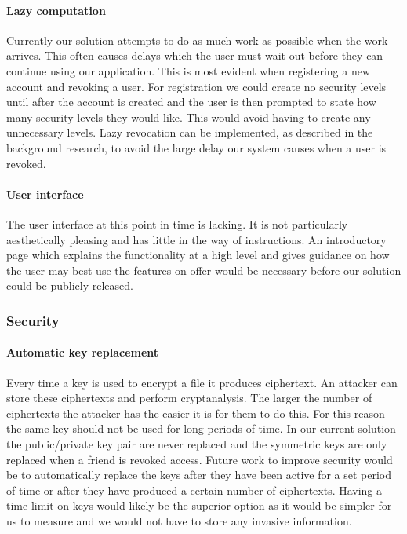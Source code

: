 \documentclass[12pt, titlepage]{article}
\begin{document}
\paragraph*{Lazy computation} Currently our solution attempts to do as much work as possible when the work arrives. This often causes delays which the user must wait out before they can continue using our application. This is most evident when registering a new account and revoking a user. For registration we could create no security levels until after the account is created and the user is then prompted to state how many security levels they would like. This would avoid having to create any unnecessary levels.
\newline \indent Lazy revocation can be implemented, as described in the background research, to avoid the large delay our system causes when a user is revoked.
\paragraph*{User interface} The user interface at this point in time is lacking. It is not particularly aesthetically pleasing and has little in the way of instructions. An introductory page which explains the functionality at a high level and gives guidance on how the user may best use the features on offer would be necessary before our solution could be publicly released.

\subsubsection*{Security}
\paragraph*{Automatic key replacement} Every time a key is used to encrypt a file it produces ciphertext. An attacker can store these ciphertexts and perform cryptanalysis. The larger the number of ciphertexts the attacker has the easier it is for them to do this. For this reason the same key should not be used for long periods of time. In our current solution the public/private key pair are never replaced and the symmetric keys are only replaced when a friend is revoked access. Future work to improve security would be to automatically replace the keys after they have been active for a set period of time or after they have produced a certain number of ciphertexts. Having a time limit on keys would likely be the superior option as it would be simpler for us to measure and we would not have to store any invasive information.
\end{document}
